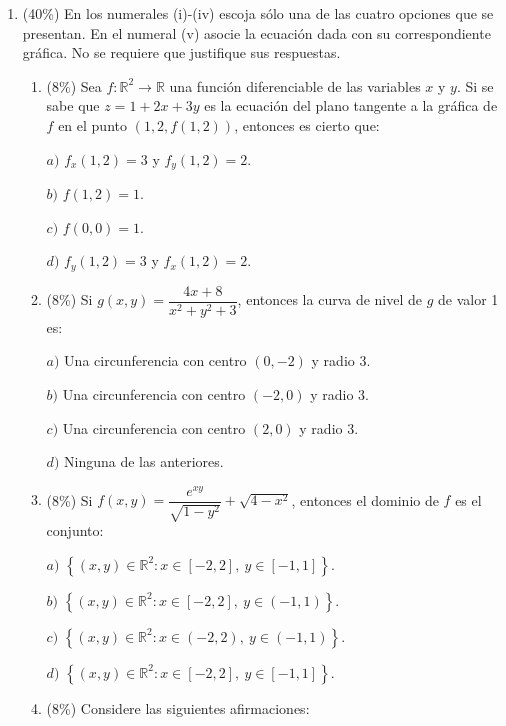 \documentclass[11pt]{article}
\begin{document}
\vspace{10pt}
\begin{enumerate}
\item{} (40\%) En los numerales (i)-(iv) escoja sólo una de las cuatro opciones que se presentan. En el numeral (v) asocie la ecuación dada con su correspondiente gráfica. No se requiere que justifique sus respuestas.

\begin{enumerate}
\item{} (8\%) Sea $f:\mathbb{R}^2\to\mathbb{R}$ una función diferenciable de las variables $x$ y $y$. Si se sabe que $z=1+2x+3y$ es la ecuación del plano tangente a la gráfica de $f$ en el punto $(1,2,f(1,2))$, entonces es cierto que:

\vspace{4pt}
\noindent $a)$ $f_x(1,2)=3$ y $f_y(1,2)=2$.

\noindent $b)$ $f(1,2)=1$.

\noindent $c)$ $f(0,0)=1$.

\noindent $d)$ $f_y(1,2)=3$ y $f_x(1,2)=2$.

\item{} (8\%) Si $g(x,y)=\dfrac{4x+8}{x^2+y^2+3}$, entonces la curva de nivel de $g$ de valor 1 es:

\vspace{4pt}
\noindent $a)$ Una circunferencia con centro $(0,-2)$ y radio 3.

\noindent $b)$ Una circunferencia con centro $(-2,0)$ y radio 3.

\noindent $c)$ Una circunferencia con centro $(2,0)$ y radio 3.

\noindent $d)$ Ninguna de las anteriores.

\item{} (8\%) Si $f(x,y)=\dfrac{e^{xy}}{\sqrt{1-y^2}}+\sqrt{4-x^2}$, entonces el dominio de $f$ es el conjunto:

\vspace{4pt}
\noindent $a)$ $\left\{(x,y)\in\mathbb{R}^2: x\in[-2,2],\ y\in[-1,1]\right\}$.

\noindent $b)$ $\left\{(x,y)\in\mathbb{R}^2: x\in[-2,2],\ y\in(-1,1)\right\}$.

\noindent $c)$ $\left\{(x,y)\in\mathbb{R}^2: x\in(-2,2),\ y\in(-1,1)\right\}$.

\noindent $d)$ $\left\{(x,y)\in\mathbb{R}^2: x\in[-2,2],\ y\in[-1,1]\right\}$.

\item{} (8\%) Considere las siguientes afirmaciones:


\end{enumerate}
\end{enumerate}
\end{document}
